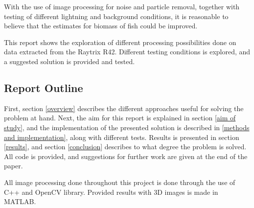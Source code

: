 With the use of image processing for noise and particle removal, together with testing of different lightning and background conditions, it is reasonable to believe that the estimates for biomass of fish could be improved.

This report shows the exploration of different processing possibilities done on data extracted from the Raytrix R42. Different testing conditions is explored, and a suggested solution is provided and tested.




\subsection{Report Outline} \label{report_outline}

First, section \ref{overview} describes the different approaches useful for solving the problem at hand. Next, the aim for this report is explained in section \ref{aim of study}, and the implementation of the presented solution is described in \ref{methods and implementation}, along with different tests. Results is presented in section \ref{results}, and section \ref{conclusion} describes to what degree the problem is solved. All code is provided, and suggestions for further work are given at the end of the paper.

All image processing done throughout this project is done through the use of C++ and OpenCV library. Provided results with 3D images is made in MATLAB.



